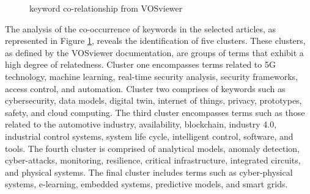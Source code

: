 \begin{figure}[H]
    
    \caption{keyword co-relationship from VOSviewer}
    \label{fig:co-occurrence-vosv}
\end{figure}

The analysis of the co-occurrence of keywords in the selected articles, as represented in Figure \ref{fig:co-occurrence-vosv}, reveals the identification of five clusters. These clusters, as defined by the VOSviewer documentation, are groups of terms that exhibit a high degree of relatedness. Cluster one encompasses terms related to 5G technology, machine learning, real-time security analysis, security frameworks, access control, and automation. Cluster two comprises of keywords such as cybersecurity, data models, digital twin, internet of things, privacy, prototypes, safety, and cloud computing. The third cluster encompasses terms such as those related to the automotive industry, availability, blockchain, industry 4.0, industrial control systems, system life cycle, intelligent control, software, and tools. The fourth cluster is comprised of analytical models, anomaly detection, cyber-attacks, monitoring, resilience, critical infrastructure, integrated circuits, and physical systems. The final cluster includes terms such as cyber-physical systems, e-learning, embedded systems, predictive models, and smart grids.